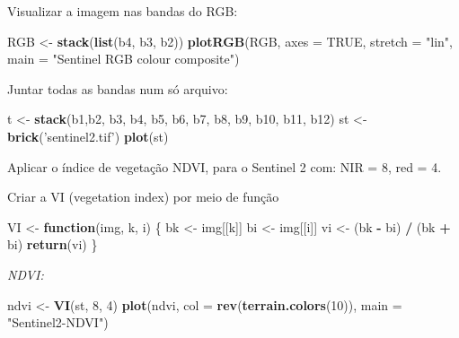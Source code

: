 \documentclass[
]{book}
\newenvironment{Shaded}{\begin{snugshade}}{\end{snugshade}}
\newcommand{\ControlFlowTok}[1]{\textcolor[rgb]{0.13,0.29,0.53}{\textbf{#1}}}
\newcommand{\DataTypeTok}[1]{\textcolor[rgb]{0.13,0.29,0.53}{#1}}
\newcommand{\DecValTok}[1]{\textcolor[rgb]{0.00,0.00,0.81}{#1}}
\newcommand{\KeywordTok}[1]{\textcolor[rgb]{0.13,0.29,0.53}{\textbf{#1}}}
\newcommand{\NormalTok}[1]{#1}
\newcommand{\OperatorTok}[1]{\textcolor[rgb]{0.81,0.36,0.00}{\textbf{#1}}}
\newcommand{\OtherTok}[1]{\textcolor[rgb]{0.56,0.35,0.01}{#1}}
\newcommand{\StringTok}[1]{\textcolor[rgb]{0.31,0.60,0.02}{#1}}
\begin{document}
Visualizar a imagem nas bandas do RGB:

\begin{Shaded}
\begin{Highlighting}[]
\NormalTok{RGB <-}\StringTok{ }\KeywordTok{stack}\NormalTok{(}\KeywordTok{list}\NormalTok{(b4, b3, b2))              }
\KeywordTok{plotRGB}\NormalTok{(RGB, }\DataTypeTok{axes =} \OtherTok{TRUE}\NormalTok{, }\DataTypeTok{stretch =} \StringTok{"lin"}\NormalTok{, }\DataTypeTok{main =} \StringTok{"Sentinel RGB colour composite"}\NormalTok{)}
\end{Highlighting}
\end{Shaded}

Juntar todas as bandas num só arquivo:

\begin{Shaded}
\begin{Highlighting}[]
\NormalTok{t <-}\StringTok{ }\KeywordTok{stack}\NormalTok{(b1,b2, b3, b4, b5, b6, b7, b8, b9, b10, b11, b12)}
\NormalTok{st <-}\StringTok{ }\KeywordTok{brick}\NormalTok{(}\StringTok{'sentinel2.tif'}\NormalTok{)}
\KeywordTok{plot}\NormalTok{(st)}
\end{Highlighting}
\end{Shaded}

Aplicar o índice de vegetação NDVI, para o Sentinel 2 com: NIR = 8, red = 4.

Criar a VI (vegetation index) por meio de função

\begin{Shaded}
\begin{Highlighting}[]
\NormalTok{VI <-}\StringTok{ }\ControlFlowTok{function}\NormalTok{(img, k, i) \{}
\NormalTok{  bk <-}\StringTok{ }\NormalTok{img[[k]]}
\NormalTok{  bi <-}\StringTok{ }\NormalTok{img[[i]]}
\NormalTok{  vi <-}\StringTok{ }\NormalTok{(bk }\OperatorTok{-}\StringTok{ }\NormalTok{bi) }\OperatorTok{/}\StringTok{ }\NormalTok{(bk }\OperatorTok{+}\StringTok{ }\NormalTok{bi)}
  \KeywordTok{return}\NormalTok{(vi)}
\NormalTok{\}}
\end{Highlighting}
\end{Shaded}

\emph{NDVI:}

\begin{Shaded}
\begin{Highlighting}[]
\NormalTok{ndvi <-}\StringTok{ }\KeywordTok{VI}\NormalTok{(st, }\DecValTok{8}\NormalTok{, }\DecValTok{4}\NormalTok{)}
\KeywordTok{plot}\NormalTok{(ndvi, }\DataTypeTok{col =} \KeywordTok{rev}\NormalTok{(}\KeywordTok{terrain.colors}\NormalTok{(}\DecValTok{10}\NormalTok{)), }\DataTypeTok{main =} \StringTok{"Sentinel2-NDVI"}\NormalTok{)}
\end{Highlighting}
\end{Shaded}
\end{document}
